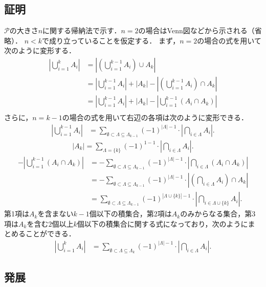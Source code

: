\documentclass{jsarticle}
\begin{document}
\subsection{証明}
$\mathcal{P}$の大きさ$n$に関する帰納法で示す．$n=2$の場合はVenn図などから示される（省略）．
$n<k$で成り立っていることを仮定する．
まず，$n=2$の場合の式を用いて次のように変形する．
\begin{align*}
  \left|\bigcup_{i=1}^k A_i\right| &= \left|\left(\bigcup_{i=1}^{k-1} A_i\right)\cup A_k\right|\\
  &= \left|\bigcup_{i=1}^{k-1} A_i\right| + |A_k| - \left|\left(\bigcup_{i=1}^{k-1} A_i\right)\cap A_k\right|\\
  &= \left|\bigcup_{i=1}^{k-1} A_i\right| + |A_k| - \left|\bigcup_{i=1}^{k-1} (A_i\cap A_k)\right|\\
\end{align*}
さらに，$n=k-1$の場合の式を用いて右辺の各項は次のように変形できる．
\begin{align*}
  \left|\bigcup_{i=1}^{k-1} A_i\right|
  &= \sum_{\emptyset\subset\Lambda\subseteq\Lambda_{k-1}} (-1)^{|\Lambda|-1} \cdot\left|\bigcap_{i\in\Lambda} A_i\right|.
\end{align*}
\begin{align*}
  |A_k| = \sum_{\Lambda=\{k\}} (-1)^{1-1} \cdot\left|\bigcap_{i\in\Lambda} A_i\right|.
\end{align*}
\begin{align*}
  -\left|\bigcup_{i=1}^{k-1} (A_i\cap A_k)\right|
  &= -\sum_{\emptyset\subset\Lambda\subseteq\Lambda_{k-1}} (-1)^{|\Lambda|-1} \cdot\left|\bigcap_{i\in\Lambda} (A_i\cap A_k)\right|\\
  &= -\sum_{\emptyset\subset\Lambda\subseteq\Lambda_{k-1}} (-1)^{|\Lambda|-1} \cdot\left|\left(\bigcap_{i\in\Lambda} A_i\right)\cap A_k\right|\\
  &= \sum_{\emptyset\subset\Lambda\subseteq\Lambda_{k-1}} (-1)^{|\Lambda\cup\{k\}|-1} \cdot\left|\bigcap_{i\in\Lambda\cup\{k\}} A_i\right|.
\end{align*}
第1項は$A_k$を含まない$k-1$個以下の積集合，第2項は$A_k$のみからなる集合，第3項は$A_k$を含む$2$個以上$k$個以下の積集合に関する式になっており，次のようにまとめることができる．
\begin{align*}
  \left|\bigcup_{i=1}^k A_i\right|
  &= \sum_{\emptyset\subset\Lambda\subseteq\Lambda_k} (-1)^{|\Lambda|-1} \cdot\left|\bigcap_{i\in\Lambda} A_i\right|.
\end{align*}

\subsection{発展}
\end{document}
